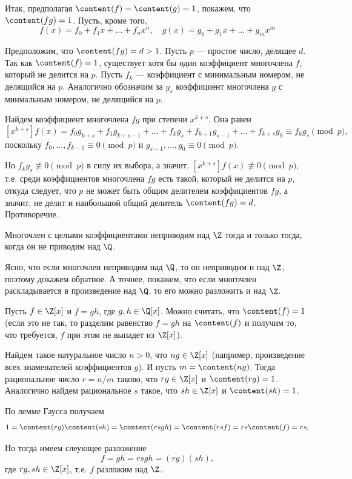 \begin{enumerate}
Итак, предполагая $\content(f)=\content(g)=1$, покажем, что $\content(fg)=1$. Пусть, кроме того,
$$
f(x) = f_0+f_1x+\dots+f_nx^n,\quad g(x) = g_0+g_1x+\dots+g_mx^m
$$

Предположим, что $\content(fg)=d>1$. Пусть $p$ --- простое число, делящее $d$. Так как $\content(f)=1$, существует хотя бы один коэффициент многочлена $f$, который не делится на $p$. Пусть $f_k$ --- коэффициент с минимальным номером, не делящийся на $p$.
Аналогично обозначим за $g_s$ коэффициент многочлена $g$ с минмальным номером, не делящийся на $p$.

Найдем коэффициент многочлена $fg$ при степени $x^{k+s}$. Она равен
$$
[x^{k+s}]f(x) = f_0g_{k+s}+f_1g_{k+s-1}+\dots+f_kg_s+f_{k+1}g_{s-1}+\dots+f_{k+s}g_0\equiv f_kg_s\pmod p,
$$
поскольку
$f_0,\dots,f_{k-1}\equiv 0\pmod p$ и $g_{s-1},\dots,g_0\equiv 0\pmod p$.

Но $f_kg_s\not\equiv 0\pmod p$ в силу их выбора, а значит, $[x^{k+s}]f(x)\not\equiv 0\pmod p$, т.е. среди коэффициентов многочлена $fg$ есть такой, который не делится на $p$, откуда следует, что $p$ не может быть общим делителем коэффициентов $fg$, а значит, не делит и наибольшой общий делитель $\content(fg)=d$. Противоречие.
\epf
\begin{sled}
Многочлен с целыми коэффициентами неприводим над $\Z$ тогда и только тогда, когда он не приводим над $\Q$.
\end{sled}
\pf
Ясно, что если многочлен неприводим над $\Q$, то он неприводим и над $\Z$, поэтому докажем обратное. А точнее, покажем, что если многочлен раскладывается в произведение над $\Q$, то его можно разложить и над $\Z$.

Пусть $f\in\Z[x]$ и $f=gh$, где $g,h\in\Q[x]$. Можно считать, что $\content(f)=1$ (если это не так, то разделим равенство $f=gh$ на $\content(f)$ и получим то, что требуется, $f$ при этом не выпадет из $\Z[x]$).

Найдем такое натуральное число $n>0$, что $ng\in\Z[x]$ (например, произведение всех знаменателей коэффициентов $g$). И пусть $m=\content(ng)$. Тогда рациональное число $r=n/m$ таково, что $rg\in\Z[x]$ и $\content(rg)=1$. Аналогично найдем рациональное $s$ такое, что $sh\in\Z[x]$ и $\content(sh)=1$.

По лемме Гаусса получаем
$$
1=\content(rg)\content(sh)=\content(rsgh)=\content(rsf)=rs\content(f)=rs,
$$

Но тогда имеем слеующее разложение
$$
f=gh=rsgh=(rg)(sh),
$$
где $rg,sh\in\Z[x]$, т.е. $f$ разложим над $\Z$.
\epf




\end{enumerate}
